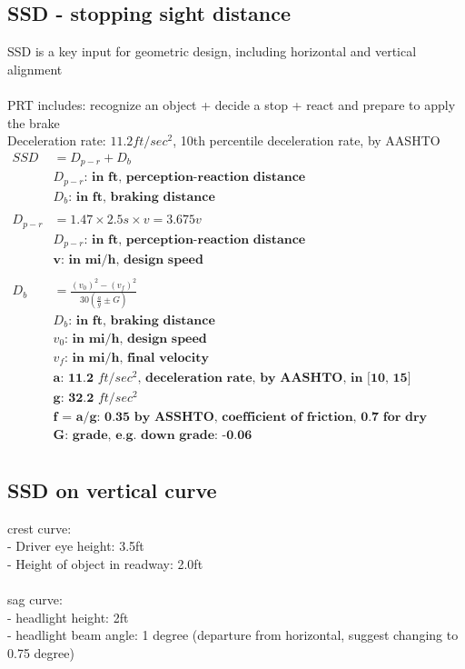 \documentclass{article}
\begin{document}
  \subsection{SSD - stopping sight distance}
  SSD is a key input for geometric design, including horizontal and vertical alignment \\
  \\
  PRT includes: recognize an object + decide a stop + react and prepare to apply the brake \\
  Deceleration rate: $11.2ft/sec^{2}$, 10th percentile deceleration rate, by AASHTO \\
  \begin{align*}
    SSD & = D_{p-r} + D_{b}\\
        & \textbf{$D_{p-r}$: in ft, perception-reaction distance} \\
        & \textbf{$D_{b}$: in ft, braking distance} \\
        \\
    D_{p-r} & = 1.47 \times 2.5s \times v = 3.675v \\
            & \textbf{$D_{p-r}$: in ft, perception-reaction distance} \\
            & \textbf{v: in mi/h, design speed} \\
            \\
    D_{b} & = \frac{(v_{0})^2 - (v_{f})^2}{30(\frac{a}{g} \pm G)} \\
          & \textbf{$D_{b}$: in ft, braking distance}\\
          & \textbf{$v_{0}$: in mi/h, design speed} \\
          & \textbf{$v_{f}$: in mi/h, final velocity}\\
          & \textbf{a: 11.2 $ft/sec^2$, deceleration rate, by AASHTO, in [10, 15]} \\
          & \textbf{g: 32.2 $ft/sec^2$} \\
          & \textbf{f = a/g: 0.35 by ASSHTO, coefficient of friction, 0.7 for dry roads, 0.3-0.4 for wed roads} \\
          & \textbf{G: grade, e.g. down grade: -0.06} \\
  \end{align*}

  \subsection{SSD on vertical curve}
  crest curve: \\
    - Driver eye height: 3.5ft \\
    - Height of object in readway: 2.0ft \\
    \\
  sag curve: \\
    - headlight height: 2ft \\
    - headlight beam angle: 1 degree (departure from horizontal, suggest changing to 0.75 degree)
\end{document}
